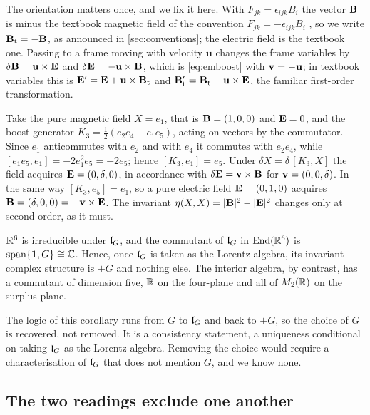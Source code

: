The orientation matters once, and we fix it here. With $F_{jk}=\epsilon_{ijk}B_i$ the vector $\mathbf B$ is minus the textbook magnetic
field of the convention $F_{jk}=-\epsilon_{ijk}B_i$ \cite{Jackson}, so we write $\mathbf B_{\rm t}=-\mathbf B$, as announced in \cref{sec:conventions};
the electric field is the textbook one. Passing to a frame moving with velocity $\mathbf u$ changes the frame variables by
$\delta\mathbf B=\mathbf u\times\mathbf E$ and $\delta\mathbf E=-\mathbf u\times\mathbf B$, which is \eqref{eq:emboost} with $\mathbf v=-\mathbf u$; in textbook
variables this is $\mathbf E'=\mathbf E+\mathbf u\times\mathbf B_{\rm t}$ and $\mathbf B_{\rm t}'=\mathbf B_{\rm t}-\mathbf u\times\mathbf E$, the familiar first-order transformation.

\begin{example}
\label{ex:emboost}
Take the pure magnetic field $X=e_1$, that is $\mathbf B=(1,0,0)$ and $\mathbf E=0$, and the boost generator $K_3=\tfrac12(e_2e_4-e_1e_5)$,
acting on vectors by the commutator. Since $e_1$ anticommutes with $e_2$ and with $e_4$ it commutes with $e_2e_4$, while
$[e_1e_5,e_1]=-2e_1^2e_5=-2e_5$; hence $[K_3,e_1]=e_5$. Under $\delta X=\delta\,[K_3,X]$ the field acquires $\mathbf E=(0,\delta,0)$, in accordance
with $\delta\mathbf E=\mathbf v\times\mathbf B$ for $\mathbf v=(0,0,\delta)$. In the same way $[K_3,e_5]=e_1$, so a pure electric field $\mathbf E=(0,1,0)$ acquires
$\mathbf B=(\delta,0,0)=-\mathbf v\times\mathbf E$. The invariant $\eta(X,X)=|\mathbf B|^2-|\mathbf E|^2$ changes only at
second order, as it must.
\end{example}

\begin{corollary}
\label{cor:Gselected}
$\mathbb{R}^6$ is irreducible under $\mathfrak l_G$, and the commutant of $\mathfrak l_G$ in $\operatorname{End}(\mathbb{R}^6)$ is $\operatorname{span}\{\mathbf 1,G\}\cong\mathbb{C}$. Hence, once
$\mathfrak l_G$ is taken as the Lorentz algebra, its invariant complex structure is $\pm G$ and nothing else. The interior algebra, by contrast,
has a commutant of dimension five, $\mathbb{R}$ on the four-plane and all of $M_2(\mathbb{R})$ on the surplus plane.
\end{corollary}

The logic of this corollary runs from $G$ to $\mathfrak l_G$ and back to $\pm G$, so the choice of $G$ is recovered, not removed. It is a
consistency statement, a uniqueness conditional on taking $\mathfrak l_G$ as the Lorentz algebra. Removing the choice would require a
characterisation of $\mathfrak l_G$ that does not mention $G$, and we know none.

\subsection{The two readings exclude one another}

